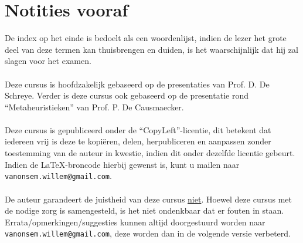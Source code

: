 \documentclass[titlepage,a4paper]{article}
\begin{document}
\section*{Notities vooraf}
\begin{it}
De index op het einde is bedoelt als een woordenlijst, indien de lezer het grote deel van deze termen kan thuisbrengen en duiden, is het waarschijnlijk dat hij zal slagen voor het examen.
\\\\
Deze cursus is hoofdzakelijk gebaseerd op de presentaties van Prof. D. De Schreye. Verder is deze cursus ook gebaseerd op de presentatie rond ``Metaheuristieken'' van Prof. P. De Causmaecker.
\\\\
Deze cursus is gepubliceerd onder de ``CopyLeft''-licentie, dit betekent dat iedereen vrij is deze te kopi\"eren, delen, herpubliceren en aanpassen zonder toestemming van de auteur in kwestie, indien dit onder dezelfde licentie gebeurt.\\ Indien de \LaTeX-broncode hierbij gewenst is, kunt u mailen naar {\tt vanonsem.willem@gmail.com}.
\\\\
De auteur garandeert de juistheid van deze cursus \underline{niet}. Hoewel deze cursus met de nodige zorg is samengesteld, is het niet ondenkbaar dat er fouten in staan. Errata/opmerkingen/suggesties kunnen altijd doorgestuurd worden naar {\tt vanonsem.willem@gmail.com}, deze worden dan in de volgende versie verbeterd.


\end{it}
\end{document}

